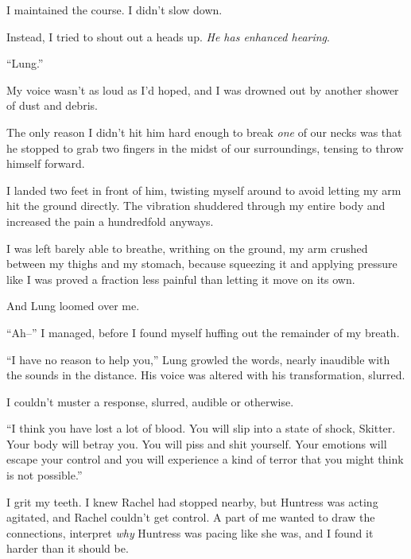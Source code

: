 I maintained the course.  I didn't slow down.



Instead, I tried to shout out a heads up.  \emph{He has enhanced hearing}.



``Lung.''



My voice wasn't as loud as I'd hoped, and I was drowned out by another shower of dust and debris.



The only reason I didn't hit him hard enough to break \emph{one} of our necks was that he stopped to grab two fingers in the midst of our surroundings, tensing to throw himself forward.



I landed two feet in front of him, twisting myself around to avoid letting my arm hit the ground directly.  The vibration shuddered through my entire body and increased the pain a hundredfold anyways.



I was left barely able to breathe, writhing on the ground, my arm crushed between my thighs and my stomach, because squeezing it and applying pressure like I was proved a fraction less painful than letting it move on its own.



And Lung loomed over me.



``Ah--''  I managed, before I found myself huffing out the remainder of my breath.



``I have no reason to help you,'' Lung growled the words, nearly inaudible with the sounds in the distance.  His voice was altered with his transformation, slurred.



I couldn't muster a response, slurred, audible or otherwise.



``I think you have lost a lot of blood.  You will slip into a state of shock, Skitter.  Your body will betray you.  You will piss and shit yourself.  Your emotions will escape your control and you will experience a kind of terror that you might think is not possible.''



I grit my teeth.  I knew Rachel had stopped nearby, but Huntress was acting agitated, and Rachel couldn't get control.  A part of me wanted to draw the connections, interpret \emph{why} Huntress was pacing like she was, and I found it harder than it should be.



